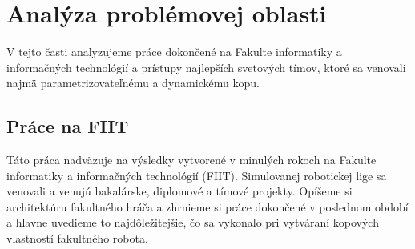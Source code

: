\section{Analýza problémovej oblasti} \label{sec_analysis}
V tejto časti analyzujeme práce dokončené na Fakulte informatiky a informačných technológií a prístupy najlepších svetových tímov, ktoré sa venovali najmä parametrizovateľnému a dynamickému kopu.

\subsection{Práce na FIIT}

Táto práca nadväzuje na výsledky vytvorené v minulých rokoch na Fakulte informatiky a informačných technológií (FIIT). Simulovanej robotickej lige sa venovali a venujú bakalárske, diplomové a tímové projekty. Opíšeme si architektúru fakultného hráča a zhrnieme si práce dokončené v poslednom období a hlavne uvedieme to najdôležitejšie, čo sa vykonalo pri vytváraní kopových vlastností fakultného robota.
